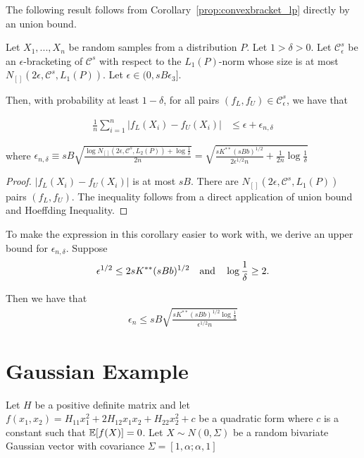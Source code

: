 The following result follows from Corollary~\ref{prop:convexbracket_lp} directly by an union bound. 

\begin{corollary}
\label{cor:convexbracket_ln}
Let $X_1,...,X_n$ be random samples from a distribution $P$. Let $1 > \delta > 0$. Let $\mathcal{C}^s_\epsilon$ be an $\epsilon$-bracketing of $\mathcal{C}^s$ with respect to the $L_1(P)$-norm whose size is at most $N_{[]}( 2\epsilon, \mathcal{C}^s, L_1(P))$. Let $\epsilon \in (0, s B \epsilon_3]$.

Then, with probability at least $1-\delta$, for all pairs $(f_L, f_U) \in \mathcal{C}^s_\epsilon$, we have that

\begin{align*}
\frac{1}{n} \sum_{i=1}^n |f_L(X_i) - f_U(X_i)| &\leq \epsilon + \epsilon_{n, \delta}
\end{align*}

where 
$\epsilon_{n,\delta} \equiv 
sB \sqrt{ \frac{ \log N_{[]}(2\epsilon, \mathcal{C}^s, L_2(P)) + \log \frac{1}{\delta}}{2n}} 
= \sqrt{ \frac{ sK^{**}(sBb)^{1/2}}{2\epsilon^{1/2}n} + \frac{1}{2n} \log \frac{1}{\delta}}$
\end{corollary}

\begin{proof}
$|f_L(X_i) - f_U(X_i)|$ is at most $sB$. There are $N_{[]}(2\epsilon, \mathcal{C}^s, L_1(P))$ pairs $(f_L, f_U)$. The inequality follows from a direct application of union bound and Hoeffding Inequality.
\end{proof}

To make the expression in this corollary easier to work with, we derive an upper bound for $\epsilon_{n, \delta}$. Suppose 
\begin{align}
\epsilon^{1/2} \leq 2sK^{**} (sBb)^{1/2} \quad \textrm{and} \quad \log \frac{1}{\delta} \geq 2. \label{cond:simplify_covering_number}
\end{align}

Then we have that
\begin{align*}
\epsilon_n \leq sB \sqrt{ \frac{ sK^{**} (sBb)^{1/2} \log \frac{1}{\delta}}{\epsilon^{1/2}n}}
\end{align*}

\section{Gaussian Example}
\label{sec:gaussian_example}

Let $H$ be a positive definite matrix and let $f(x_1, x_2) = H_{11} x_1^2 + 2H_{12} x_1x_2 + H_{22} x_2^2 + c$ be a quadratic form where $c$ is a constant such that ${\mathbb E}[f(X)] = 0$. Let $X \sim N(0, \Sigma)$ be a random bivariate Gaussian vector with covariance $\Sigma = [1, \alpha; \alpha, 1]$ 

